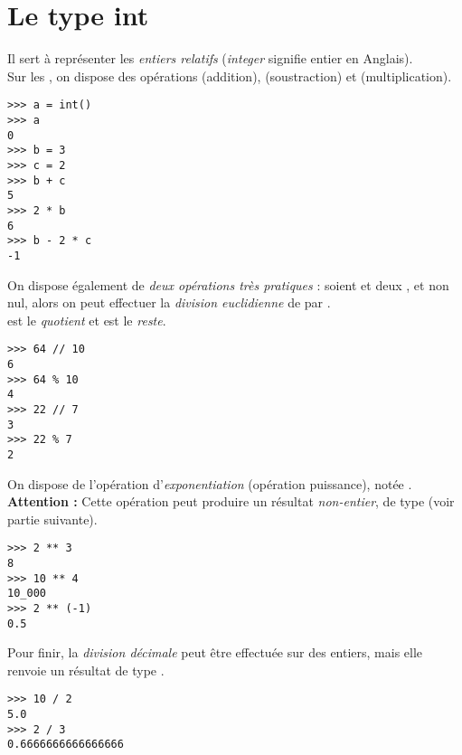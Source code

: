 \section{Le type int}
Il sert à représenter les \textit{entiers relatifs} (\textit{integer} signifie \og entier \fg{} en Anglais).\\
Sur les , on dispose des opérations \pythoninline{+} (addition), \pythoninline{-} (soustraction) et \pythoninline{*} (multiplication).

\begin{pys}\begin{verbatim}
>>> a = int()
>>> a
0
>>> b = 3
>>> c = 2
>>> b + c
5
>>> 2 * b
6
>>> b - 2 * c
-1
\end{verbatim}
\end{pys}

On dispose également de \textit{deux opérations très pratiques} : soient  et  deux , et  non nul, alors on peut effectuer
la \textit{division euclidienne} de  par .\\
 est le \textit{quotient} et  est le \textit{reste}.

\begin{pys}\begin{verbatim}
>>> 64 // 10
6
>>> 64 % 10
4
>>> 22 // 7
3
>>> 22 % 7
2
\end{verbatim}
\end{pys}



On dispose de l'opération d'\textit{exponentiation} (opération puissance), notée \pythoninline{**}.\\
\textbf{Attention :} Cette opération peut produire un résultat \textit{non-entier}, de type  (voir partie suivante).

\begin{pys}\begin{verbatim}
>>> 2 ** 3
8
>>> 10 ** 4
10_000
>>> 2 ** (-1)
0.5
\end{verbatim}
\end{pys}

Pour finir, la \textit{division décimale} peut être effectuée sur des entiers, mais elle renvoie un résultat de type .

\begin{pys}\begin{verbatim}
>>> 10 / 2
5.0
>>> 2 / 3
0.6666666666666666
\end{verbatim}
\end{pys}


